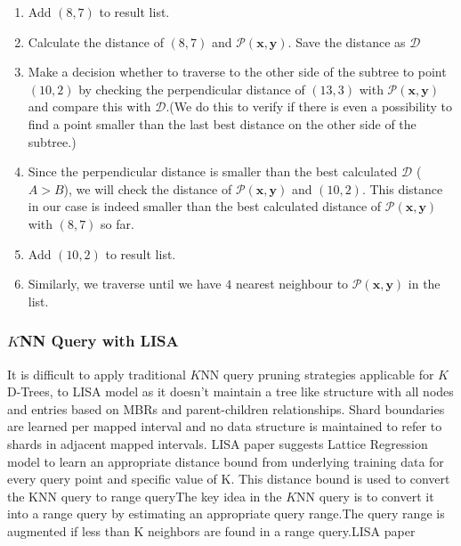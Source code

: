 \begin{mscexample}
\begin{enumerate}
    	\item Add $(8,7)$ to result list.
    	
    	\item Calculate the distance of $(8,7)$ and $\mathcal{P}(\boldsymbol{x}, \boldsymbol{y})$. Save the distance as $\mathcal{D}$
    	
    	\item Make a decision whether to traverse to the other side of the subtree to point $(10,2)$ by checking the perpendicular distance of $(13,3)$ with $\mathcal{P}(\boldsymbol{x}, \boldsymbol{y})$ and compare this with $\mathcal{D}$.(We do this to verify if there is even a possibility to find a point smaller than the last best distance on the other side of the subtree.) 
    	
    	\item Since the perpendicular distance is smaller than the best calculated $\mathcal{D}$ ($A > B$), we will check the distance of $\mathcal{P}(\boldsymbol{x}, \boldsymbol{y})$ and $(10,2)$. This distance in our case is indeed smaller than the best calculated distance of $\mathcal{P}(\boldsymbol{x}, \boldsymbol{y})$ with $(8,7)$ so far.
    	
    	\item Add $(10,2)$ to result list.
    	
    	\item Similarly, we traverse until we have $4$ nearest neighbour to $\mathcal{P}(\boldsymbol{x}, \boldsymbol{y})$ in the list.
	\end{enumerate}
\end{mscexample}



\subsubsection{$K$NN Query with LISA}
It is difficult to apply traditional $K$NN query pruning strategies applicable for $K$D-Trees, to LISA model as it doesn't maintain a tree like structure with all nodes and
entries based on MBRs and parent-children relationships. Shard boundaries are learned per mapped interval and no data structure is maintained to refer to shards in adjacent mapped intervals. LISA paper suggests Lattice Regression model to learn an appropriate distance bound from underlying training data for every query point and specific value of K. This distance bound is used to convert the KNN query to range queryThe key idea in the $K$NN query is to convert it into a range query by estimating an appropriate query range.The query range is augmented if less than K neighbors are found in a range query.LISA paper 

